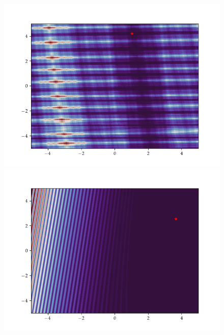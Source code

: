 \begin{figure}[h]
    \begin{minipage}[b]{0.32\textwidth}
      \includegraphics[trim=2.5cm 1.3cm 2.5cm 1.3cm,clip,width=\textwidth]{Figures/coco/f16.png}
    \end{minipage}
    \hfill
    \begin{minipage}[b]{0.32\textwidth}
      \includegraphics[trim=2.5cm 1.3cm 2.5cm 1.3cm,clip,width=\textwidth]{Figures/coco/f17.png}
    \end{minipage}
    \hfill
    \begin{minipage}[b]{0.32\textwidth}

\end{minipage}
\end{figure}
